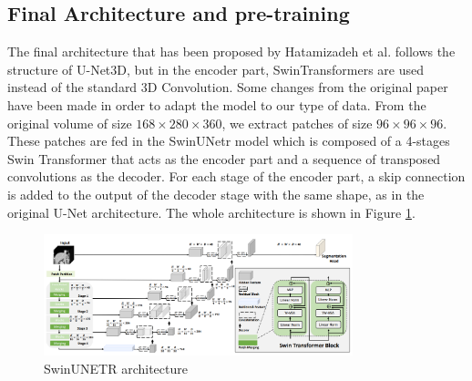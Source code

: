 \subsection{Final Architecture and pre-training}
The final architecture that has been proposed by Hatamizadeh et al. follows the
structure of U-Net3D, but in the encoder part, SwinTransformers are used instead
of the standard 3D Convolution. Some changes from the original paper have been
made in order to adapt the model to our type of data. From the original volume
of size $168 \times 280 \times 360$, we extract patches of size $96 \times 96
\times 96$. These patches are fed in the SwinUNetr model which is composed of a
4-stages Swin Transformer that acts as the encoder part and a sequence of
transposed convolutions as the decoder. For each stage of the encoder part, a
skip connection is added to the output of the decoder stage with the same shape,
as in the original U-Net architecture. The whole architecture is shown in Figure
\ref{fig:swinunetr}.

\begin{figure}[ht!]
  \centering
  \includegraphics[width=0.8\textwidth]{Images/SwinUNETR.png}
  \caption{SwinUNETR architecture}
  \label{fig:swinunetr}
\end{figure}

